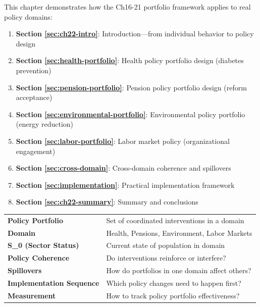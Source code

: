 \begin{tcolorbox}[
    colback=green!5!white,
    colframe=green!75!black,
    title={\textbf{Chapter Overview}},
    fonttitle=\bfseries
]
This chapter demonstrates how the Ch16-21 portfolio framework applies to real policy domains:

\begin{enumerate}[nosep]
    \item \textbf{Section \ref{sec:ch22-intro}}: Introduction---from individual behavior to policy design
    \item \textbf{Section \ref{sec:health-portfolio}}: Health policy portfolio design (diabetes prevention)
    \item \textbf{Section \ref{sec:pension-portfolio}}: Pension policy portfolio design (reform acceptance)
    \item \textbf{Section \ref{sec:environmental-portfolio}}: Environmental policy portfolio (energy reduction)
    \item \textbf{Section \ref{sec:labor-portfolio}}: Labor market policy (organizational engagement)
    \item \textbf{Section \ref{sec:cross-domain}}: Cross-domain coherence and spillovers
    \item \textbf{Section \ref{sec:implementation}}: Practical implementation framework
    \item \textbf{Section \ref{sec:ch22-summary}}: Summary and conclusions
\end{enumerate}
\end{tcolorbox}




\begin{tcolorbox}[colback=blue!5!white, colframe=blue!75!black, title=Key Concepts in This Chapter]
\small
\begin{tabular}{@{}ll@{}}
\textbf{Policy Portfolio} & Set of coordinated interventions in a domain \\
\textbf{Domain} & Health, Pensions, Environment, Labor Markets \\
\textbf{S_0 (Sector Status)} & Current state of population in domain \\
\textbf{Policy Coherence} & Do interventions reinforce or interfere? \\
\textbf{Spillovers} & How do portfolios in one domain affect others? \\
\textbf{Implementation Sequence} & Which policy changes need to happen first? \\
\textbf{Measurement} & How to track policy portfolio effectiveness? \\
\end{tabular}
\end{tcolorbox}

